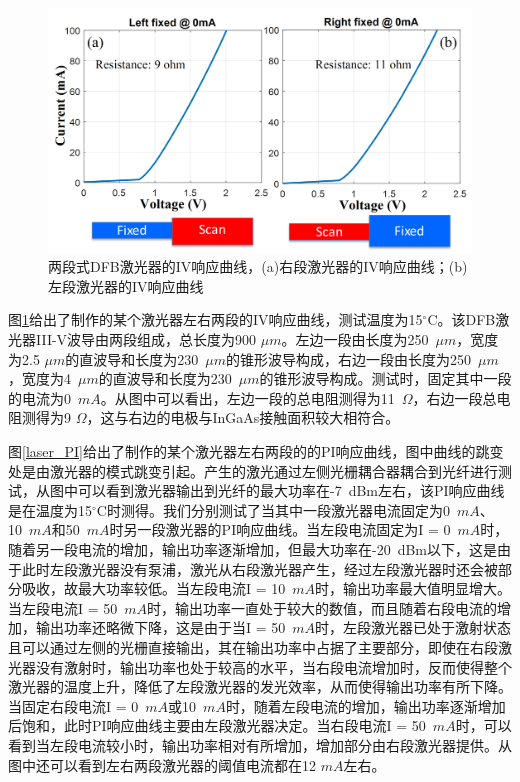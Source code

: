 \begin{figure}[htb]
	\centering
	\includegraphics[width=15cm]{./Pictures/laser_IV.jpg}
	\captionsetup{justification=centering}
	\caption{两段式DFB激光器的IV响应曲线，(a)右段激光器的IV响应曲线；(b)左段激光器的IV响应曲线}
	\label{laser_IV}
\end{figure}

图\ref{laser_IV}给出了制作的某个激光器左右两段的IV响应曲线，测试温度为15$^{\circ}$C。该DFB激光器III-V波导由两段组成，总长度为900 $\mu m$。左边一段由长度为250~$\mu m$，宽度为2.5 $\mu m$的直波导和长度为230~$\mu m$的锥形波导构成，右边一段由长度为250~$\mu m$，宽度为4~$\mu m$的直波导和长度为230~$\mu m$的锥形波导构成。测试时，固定其中一段的电流为0~$mA$。从图中可以看出，左边一段的总电阻测得为11~$\Omega$，右边一段总电阻测得为9 $\Omega$，这与右边的电极与InGaAs接触面积较大相符合。

图\ref{laser_PI}给出了制作的某个激光器左右两段的的PI响应曲线，图中曲线的跳变处是由激光器的模式跳变引起。产生的激光通过左侧光栅耦合器耦合到光纤进行测试，从图中可以看到激光器输出到光纤的最大功率在-7~dBm左右，该PI响应曲线是在温度为15$^{\circ}$C时测得。我们分别测试了当其中一段激光器电流固定为0~$mA$、10~$mA$和50~$mA$时另一段激光器的PI响应曲线。当左段电流固定为I = 0~$mA$时，随着另一段电流的增加，输出功率逐渐增加，但最大功率在-20~dBm以下，这是由于此时左段激光器没有泵浦，激光从右段激光器产生，经过左段激光器时还会被部分吸收，故最大功率较低。当左段电流I = 10~$mA$时，输出功率最大值明显增大。当左段电流I = 50~$mA$时，输出功率一直处于较大的数值，而且随着右段电流的增加，输出功率还略微下降，这是由于当I = 50~$mA$时，左段激光器已处于激射状态且可以通过左侧的光栅直接输出，其在输出功率中占据了主要部分，即使在右段激光器没有激射时，输出功率也处于较高的水平，当右段电流增加时，反而使得整个激光器的温度上升，降低了左段激光器的发光效率，从而使得输出功率有所下降。当固定右段电流I = 0~$mA$或10~$mA$时，随着左段电流的增加，输出功率逐渐增加后饱和，此时PI响应曲线主要由左段激光器决定。当右段电流I = 50~$mA$时，可以看到当左段电流较小时，输出功率相对有所增加，增加部分由右段激光器提供。从图中还可以看到左右两段激光器的阈值电流都在12 $mA$左右。

